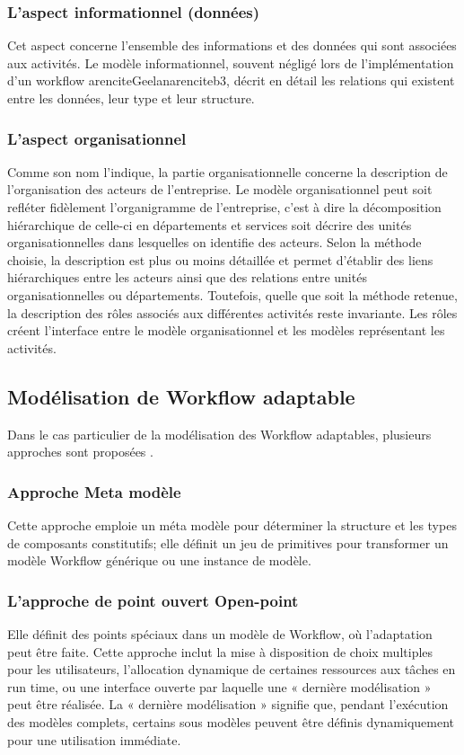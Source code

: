 { 	\subsubsection{ L'aspect informationnel (données) }
 	Cet aspect concerne l'ensemble des informations et des données qui sont associées
 	aux activités. Le modèle informationnel, souvent négligé lors de l'implémentation d'un workflow \parencite{Geelan}arencite{Geelan}arencite{b3}, décrit en détail les relations qui existent entre les données, leur type et leur structure.
 	\subsubsection{L'aspect organisationnel }
 	Comme son nom l'indique, la partie organisationnelle concerne la description de l'organisation des acteurs de l'entreprise. Le modèle organisationnel peut soit refléter fidèlement l'organigramme de l'entreprise, c'est à dire la décomposition hiérarchique de celle-ci en départements et services soit décrire des unités organisationnelles dans lesquelles on identifie des acteurs. Selon la méthode choisie, la description est plus ou moins détaillée et permet d'établir des liens hiérarchiques entre les acteurs ainsi que des relations entre unités organisationnelles ou départements. Toutefois, quelle que soit la méthode retenue, la description des rôles associés aux différentes activités reste invariante. Les rôles créent l'interface entre le modèle organisationnel et les modèles représentant les activités.
 	
 	
 	
 	\subsection{Modélisation de Workflow adaptable }
 	
 	Dans le cas particulier de la modélisation des Workflow adaptables, plusieurs approches sont proposées \parencite{Han}. 
 	
 	\subsubsection{ Approche Meta modèle}
 	Cette approche emploie un méta modèle pour déterminer la structure et les types de composants constitutifs; elle définit un jeu de primitives pour transformer un modèle Workflow générique ou une instance de modèle. 
 	
 	\subsubsection{ L’approche de point ouvert Open-point }
 	Elle définit des points spéciaux dans un modèle de Workflow, où l’adaptation peut être faite. Cette approche inclut la mise à disposition de choix multiples pour les utilisateurs, l’allocation dynamique de certaines ressources aux tâches en run time, ou une interface ouverte par laquelle une « dernière modélisation » peut être réalisée. La « dernière modélisation » signifie que, pendant l’exécution des modèles complets, certains sous modèles peuvent être définis dynamiquement pour une utilisation immédiate. 
}
